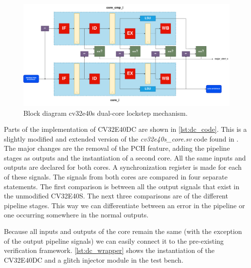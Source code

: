 \begin{figure}[ht!]
    \centering
    \includegraphics[width=\textwidth]{docs/images/dual_cores-block.png}
    \caption{Block diagram cv32e40s dual-core lockstep mechanism.}
    \label{fig:dual_block}
\end{figure}

Parts of the implementation of CV32E40DC are shown in \autoref{lst:dc_code}. This is a slightly modified and extended version of the \textit{cv32e40s\_core.sv} code found in \cite{cv32e40s_github}. The major changes are the removal of the PCH feature, adding the pipeline stages as outputs and the instantiation of a second core. All the same inputs and outputs are declared for both cores. A synchronization register is made for each of these signals. The signals from both cores are compared in four separate statements. The first comparison is between all the output signals that exist in the unmodified CV32E40S. The next three comparisons are of the different pipeline stages. This way we can differentiate between an error in the pipeline or one occurring somewhere in the normal outputs. 

Because all inputs and outputs of the core remain the same (with the exception of the output pipeline signals) we can easily connect it to the pre-existing verification framework. \autoref{lst:dc_wrapper} shows the instantiation of the CV32E40DC and a glitch injector module in the test bench.
